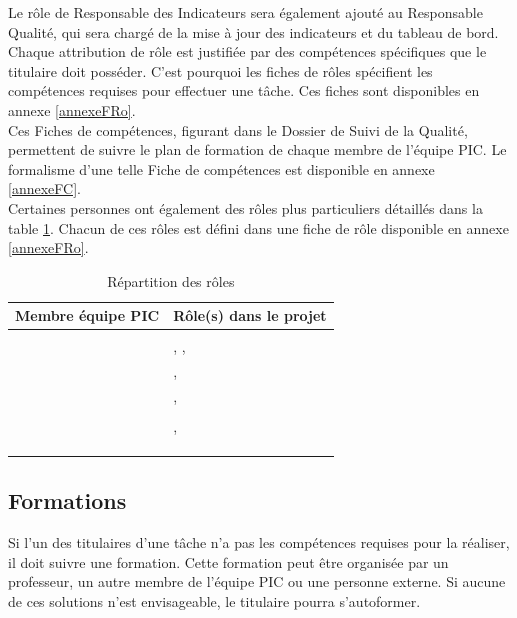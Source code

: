 \indent Le rôle de Responsable des Indicateurs sera également ajouté au Responsable Qualité, qui sera chargé de la mise à jour des indicateurs et du tableau de bord. \\

\indent Chaque attribution de rôle est justifiée par des compétences spécifiques que le titulaire doit posséder. C’est pourquoi les fiches de rôles spécifient les compétences requises pour effectuer une tâche. Ces fiches sont disponibles en annexe \ref{annexeFRo}. \\

\indent Ces Fiches de compétences, figurant dans le Dossier de Suivi de la Qualité, permettent de suivre le plan de formation de chaque membre de l’équipe PIC. Le formalisme d’une telle Fiche de compétences est disponible en annexe \ref{annexeFC}.\\

\indent Certaines personnes ont également des rôles plus particuliers détaillés dans la table \ref{repartRoles}. Chacun de ces rôles est défini dans une fiche de rôle disponible en annexe \ref{annexeFRo}.\\

\begin{table}[H]
\begin{tabular}[h]{|p{}|p{}|}
	\hline
	\rowcolor[gray]{0.85}
	Membre équipe PIC & Rôle(s) dans le projet \\\hline
	\Sergi &  \CP \\\hline
	\Pierre & \CPA, \RQ, \RI \\\hline
	\Kafui & \RQA, \D \\\hline
	\Mathieu & \RGC, \D \\\hline
	\Michel & \RD \\\hline
	\Matthieu & \RRS, \D \\\hline
	\Florian & \D \\\hline	
	\Julie & \D \\\hline
	\Melissa & \D \\\hline
\end{tabular}
\caption{\label{repartRoles} Répartition des rôles}
\end{table}

\subsection{Formations} \label{formation}

Si l'un des titulaires d'une tâche n'a pas les compétences requises pour la réaliser, il doit suivre une formation. Cette formation peut être organisée par un professeur, un autre membre de l'équipe PIC ou une personne externe. Si aucune de ces solutions n'est envisageable, le titulaire pourra s'autoformer.\\

